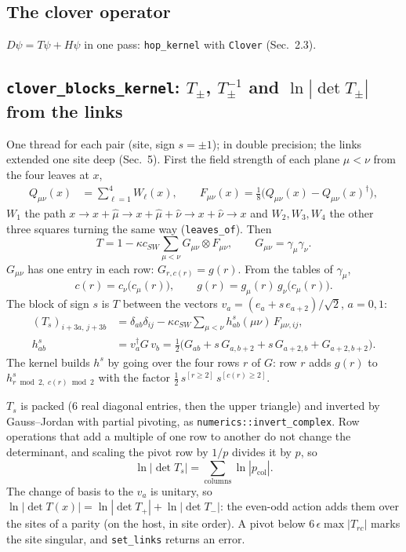 \documentclass[11pt,a4paper]{article}
\numberwithin{equation}{section}
\newcommand{\code}[1]{\texttt{\small #1}}
\newcommand{\dg}{^{\dagger}}
\begin{document}
\subsection{The clover operator}

$D\psi = T\psi + H\psi$ in one pass: \code{hop\_kernel} with \code{Clover} (Sec.~2.3).

\subsection{\code{clover\_blocks\_kernel}: $T_\pm$, $T_\pm^{-1}$ and $\ln|\det T_\pm|$ from the links}

One thread for each pair (site, sign $s=\pm1$); in double precision; the links extended one site
deep (Sec.~5). First the field strength of each plane $\mu<\nu$ from the four leaves at $x$,
\begin{align}
Q_{\mu\nu}(x) &= \sum_{\ell=1}^{4} W_\ell(x),\qquad
F_{\mu\nu}(x) = \tfrac18\big(Q_{\mu\nu}(x) - Q_{\mu\nu}(x)\dg\big),
\end{align}
$W_1$ the path $x\to x+\hat\mu\to x+\hat\mu+\hat\nu\to x+\hat\nu\to x$ and $W_2,W_3,W_4$ the other
three squares turning the same way (\code{leaves\_of}). Then
\begin{equation}
T = 1 - \kappa c_{SW}\sum_{\mu<\nu} G_{\mu\nu}\otimes F_{\mu\nu},\qquad G_{\mu\nu}=\gamma_\mu\gamma_\nu .
\end{equation}
$G_{\mu\nu}$ has one entry in each row: $G_{r,c(r)} = g(r)$. From the tables of $\gamma_\mu$,
\begin{equation}
c(r) = c_\nu\big(c_\mu(r)\big),\qquad g(r) = g_\mu(r)\,g_\nu\big(c_\mu(r)\big).
\end{equation}
The block of sign $s$ is $T$ between the vectors $v_{a}=(e_a+s\,e_{a+2})/\sqrt2$, $a=0,1$:
\begin{align}
(T_s)_{i+3a,\,j+3b} &= \delta_{ab}\delta_{ij} - \kappa c_{SW}\sum_{\mu<\nu} h^{s}_{ab}(\mu\nu)\,F_{\mu\nu,ij},\\
h^{s}_{ab} &= v_a\dg G\,v_b = \tfrac12\big(G_{ab} + s\,G_{a,b+2} + s\,G_{a+2,b} + G_{a+2,b+2}\big).
\end{align}
The kernel builds $h^s$ by going over the four rows $r$ of $G$: row $r$ adds $g(r)$ to
$h^s_{r\bmod2,\;c(r)\bmod2}$ with the factor $\tfrac12\,s^{[r\ge2]}\,s^{[c(r)\ge2]}$.

$T_s$ is packed (6 real diagonal entries, then the upper triangle) and inverted by Gauss–Jordan
with partial pivoting, as \code{numerics::invert\_complex}. Row operations that add a multiple of
one row to another do not change the determinant, and scaling the pivot row by $1/p$ divides it
by $p$, so
\begin{equation}
\ln|\det T_s| = \sum_{\text{columns}}\ln|p_{\text{col}}| .
\end{equation}
The change of basis to the $v_a$ is unitary, so $\ln|\det T(x)| = \ln|\det T_+| + \ln|\det T_-|$:
the even-odd action adds them over the sites of a parity (on the host, in site order). A pivot
below $6\,\epsilon\max|T_{rc}|$ marks the site singular, and \code{set\_links} returns an error.
\end{document}
